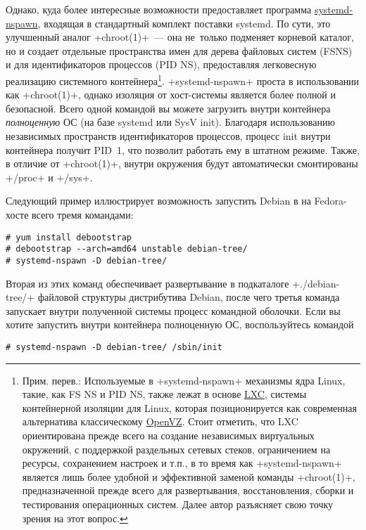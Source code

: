 \documentclass[10pt,oneside,a4paper]{article}
\begin{document}
Однако, куда более интересные возможности предоставляет программа
\href{http://0pointer.de/public/systemd-man/systemd-nspawn.html}{systemd-nspawn},
входящая в стандартный комплект поставки systemd. По сути, это улучшенный аналог
+chroot(1)+~--- она не~только подменяет корневой каталог, но и создает отдельные
пространства имен для дерева файловых систем (FSNS) и для идентификаторов
процессов (PID NS), предоставляя легковесную реализацию системного
контейнера\footnote{Прим. перев.: Используемые в +systemd-nspawn+ механизмы 
ядра Linux, такие, как FS NS и PID NS, также лежат в основе
\href{http://lxc.sourceforge.net/}{LXC}, системы контейнерной изоляции для
Linux, которая позиционируется как современная альтернатива классическому
\href{http://wiki.openvz.org/Main_Page}{OpenVZ}. Стоит отметить, что LXC 
ориентирована прежде всего на создание независимых виртуальных окружений,
с поддержкой раздельных сетевых стеков, ограничением на ресурсы, сохранением
настроек и т.п., в то время как +systemd-nspawn+ является лишь более удобной и
эффективной заменой команды +chroot(1)+, предназначенной прежде всего для
развертывания, восстановления, сборки и тестирования операционных систем. Далее
автор разъясняет свою точку зрения на этот вопрос.}.
+systemd-nspawn+ проста в использовании как +chroot(1)+, однако изоляция
от хост-системы является более полной и безопасной. Всего одной командой
вы можете загрузить внутри контейнера \emph{полноценную} ОС (на базе systemd
или SysV init). Благодаря использованию независимых пространств идентификаторов
процессов, процесс init внутри контейнера получит PID~1, что позволит работать
ему в штатном режиме. Также, в отличие от +chroot(1)+, внутри окружения 
будут автоматически смонтированы +/proc+ и +/sys+.

Следующий пример иллюстрирует возможность запустить Debian в на Fedora-хосте
всего тремя командами:
\begin{Verbatim}
# yum install debootstrap
# debootstrap --arch=amd64 unstable debian-tree/
# systemd-nspawn -D debian-tree/
\end{Verbatim}

Вторая из этих команд обеспечивает развертывание в подкаталоге +./debian-tree/+
файловой структуры дистрибутива Debian, после чего третья команда запускает
внутри полученной системы процесс командной оболочки. Если вы хотите запустить
внутри контейнера полноценную ОС, воспользуйтесь командой
\begin{Verbatim}
# systemd-nspawn -D debian-tree/ /sbin/init
\end{Verbatim}
\end{document}
